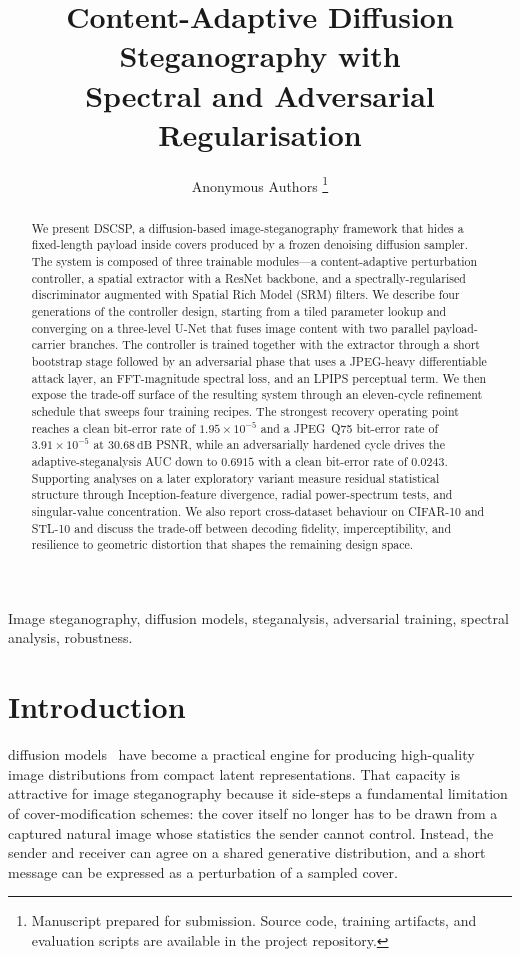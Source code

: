 \documentclass[journal]{IEEEtran}
\title{Content-Adaptive Diffusion Steganography with\\
Spectral and Adversarial Regularisation}
\author{Anonymous Authors%
\thanks{Manuscript prepared for submission. Source code, training
artifacts, and evaluation scripts are available in the project
repository.}}
\begin{document}
\maketitle

\begin{abstract}
We present DSCSP, a diffusion-based image-steganography framework that
hides a fixed-length payload inside covers produced by a frozen
denoising diffusion sampler. The system is composed of three trainable
modules---a content-adaptive perturbation controller, a spatial
extractor with a ResNet backbone, and a spectrally-regularised
discriminator augmented with Spatial Rich Model (SRM) filters. We
describe four generations of the controller design, starting from a
tiled parameter lookup and converging on a three-level U-Net that
fuses image content with two parallel payload-carrier branches. The
controller is trained together with the extractor through a short
bootstrap stage followed by an adversarial phase that uses a
JPEG-heavy differentiable attack layer, an FFT-magnitude spectral
loss, and an LPIPS perceptual term. We then expose the trade-off
surface of the resulting system through an eleven-cycle refinement
schedule that sweeps four training recipes. The strongest recovery
operating point reaches a clean bit-error rate of
$1.95\!\times\!10^{-5}$ and a JPEG~Q75 bit-error rate of
$3.91\!\times\!10^{-5}$ at $30.68\,\mathrm{dB}$ PSNR, while an
adversarially hardened cycle drives the adaptive-steganalysis AUC down
to $0.6915$ with a clean bit-error rate of $0.0243$. Supporting
analyses on a later exploratory variant measure residual statistical
structure through Inception-feature divergence, radial power-spectrum
tests, and singular-value concentration. We also report
cross-dataset behaviour on CIFAR-10 and STL-10 and discuss the
trade-off between decoding fidelity, imperceptibility, and
resilience to geometric distortion that shapes the remaining design
space.
\end{abstract}

\begin{IEEEkeywords}
Image steganography, diffusion models, steganalysis, adversarial
training, spectral analysis, robustness.
\end{IEEEkeywords}

\section{Introduction}
 diffusion models~\cite{ho2020denoising,
song2020denoising} have become a practical engine for producing
high-quality image distributions from compact latent representations.
That capacity is attractive for image steganography because it
side-steps a fundamental limitation of cover-modification schemes: the
cover itself no longer has to be drawn from a captured natural image
whose statistics the sender cannot control. Instead, the sender and
receiver can agree on a shared generative distribution, and a short
message can be expressed as a perturbation of a sampled cover.
\end{document}
